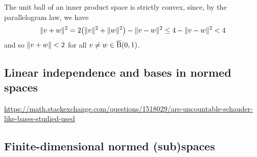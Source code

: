 \begin{example}
The unit ball of an inner product space is strictly convex, since, by the parallelogram law, we have
\[ \lVert v+w\rVert^2 = 2\big(\lVert v\rVert^2 + \lVert w\rVert^2\big) - \lVert v-w\rVert^2 \leq 4 - \lVert v-w\rVert^2 < 4 \]
and so $\lVert v+w\rVert <2$ for all $v\neq w \in \operatorname{\overline{B}}(0,1)$.
\end{example}

\subsection{Linear independence and bases in normed spaces}
\url{https://math.stackexchange.com/questions/1518029/are-uncountable-schauder-like-bases-studied-used}

\subsection{Finite-dimensional normed (sub)spaces}

